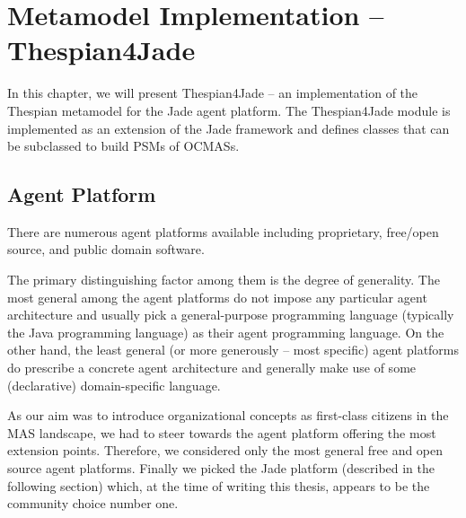 
\chapter{Metamodel Implementation -- Thespian4Jade}

In this chapter, we will present Thespian4Jade -- an implementation of the Thespian metamodel for the Jade agent platform.
The Thespian4Jade module is implemented as an extension of the Jade framework and defines classes that can be subclassed to build PSMs of OCMASs.

\section{Agent Platform}

There are numerous agent platforms available including proprietary, free/open source, and public domain software.

The primary distinguishing factor among them is the degree of generality.
The most general among the agent platforms do not impose any particular agent architecture and usually pick a general-purpose programming language (typically the Java programming language) as their agent programming language.
On the other hand, the least general (or more generously -- most specific) agent platforms do prescribe a concrete agent architecture and generally make use of some (declarative) domain-specific language.

As our aim was to introduce organizational concepts as first-class citizens in the MAS landscape, we had to steer towards the agent platform offering the most extension points.
Therefore, we considered only the most general free and open source agent platforms.
Finally we picked the Jade platform (described in the following section) which, at the time of writing this thesis, appears to be the community choice number one.  

